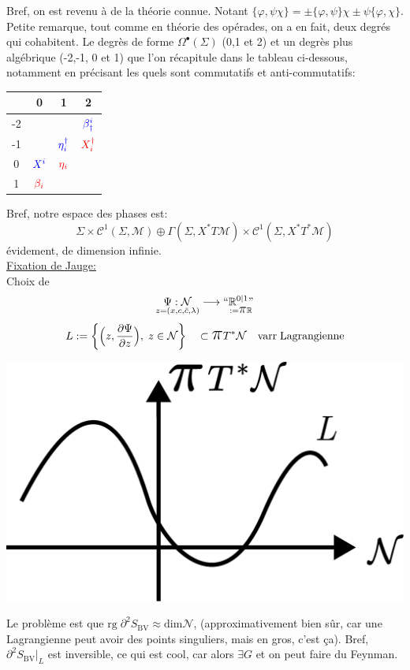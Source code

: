 \documentclass[a4paper,11pt]{article}
\newcommand{\dr}[2]{\frac{\partial {#1}}{\partial{#2}}}
\newcommand{\ppi}{{\mathlarger{\mathlarger{\mathlarger{\pi}}}}}
\begin{document}
Bref, on est revenu à de la théorie connue. Notant $\{\varphi, \psi\chi\} = \pm \{\varphi,\psi\}\chi \pm \psi\{\varphi,\chi\}$. Petite remarque, tout comme en théorie des opérades, on a en fait, deux degrés qui cohabitent. Le degrès de forme $\Omega^\bullet(\Sigma)$ (0,1 et 2) et un degrès plus algébrique (-2,-1, 0 et 1) que l'on récapitule dans le tableau ci-dessous, notamment en précisant les quels sont {\color{blue} commutatifs} et {\color{red}anti-commutatifs}:
\begin{center}
	\begin{tabular}{|c|ccc|}
		\hline
		& 0 & 1 & 2\\ \hline
		-2 & && $\color{blue}\beta^i_\dagger$\\
		-1 & & $\color{blue}\eta^\dagger_i$ & $\color{red}X^\dagger_i$\\
		0 & $\color{blue}X^i$ & $\color{red}\eta_i$ & \\
		1 & $\color{red}\beta_i$ & & \\\hline
	\end{tabular}
\end{center}

\noindent Bref, notre espace des phases est:
$$\Sigma\times\mathcal{C}^1(\Sigma,\mathcal{M}) \oplus \Gamma(\Sigma,X^*T\mathcal{M})\times \mathcal{C}^1(\Sigma,X^*T^*\mathcal{M})$$
évidement, de dimension infinie.\\

\noindent\underline{Fixation de Jauge:}\\
Choix de 
$$\underset{z=(x,c,\bar c, \lambda)}{\Psi : \mathcal{N}} \longrightarrow \underset{\;\;:=\ppi\mathbb{R}}{``\mathbb{R}^{0|1}"}$$
$$L := \left\{\Big(z,\dr\Psi z\Big), \; z\in\mathcal{N}\right\} \quad \subset \ppi  T^*\mathcal{N}\quad \mathrm{varr}\;\mathrm{Lagrangienne} $$
\begin{center}
	\includegraphics[width=.3\textwidth]{Drawings/Draw_9.pdf}
\end{center}

Le problème est que $\mathrm{rg}\; \partial^2 S_\mathrm{BV} \approx \mathrm{dim}\mathcal{N}$, (approximativement bien sûr, car une Lagrangienne peut avoir des points singuliers, mais en gros, c'est ça). Bref, $\partial^2S_\mathrm{BV}|_L$ est inversible, ce qui est cool, car alors $\exists G$ et on peut faire du Feynman.\\
\end{document}
